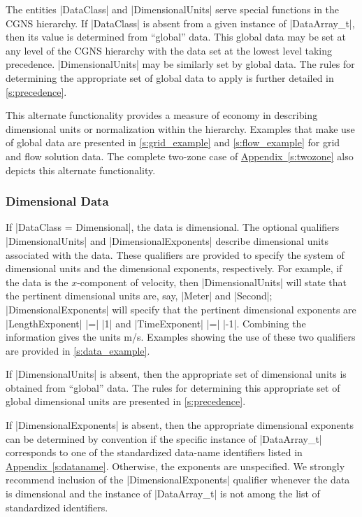 The entities |DataClass| and |DimensionalUnits| serve special functions in
the CGNS hierarchy.  If |DataClass| is absent from a given instance of
|DataArray_t|, then its value is determined from ``global'' data.  This global
data may be set at any level of the CGNS hierarchy with the data set at the
lowest level taking precedence.  |DimensionalUnits| may be similarly set by
global data.  The rules for determining the appropriate set of global data to
apply is further detailed in \autoref{s:precedence}.

This alternate functionality provides a measure of economy in describing
dimensional units or normalization within the hierarchy.  Examples that
make use of global data are presented in \autoref{s:grid_example} and
\autoref{s:flow_example} for grid and flow solution data.  The complete
two-zone case of \hyperref[s:twozone]{Appendix~\ref*{s:twozone}} also
depicts this alternate functionality.

\subsubsection{Dimensional Data}
\label{s:data_dim}

If |DataClass = Dimensional|, the data is dimensional.
The optional qualifiers |DimensionalUnits| and |DimensionalExponents|
describe dimensional units associated with the data.
These qualifiers are provided to specify the system of dimensional units
and the dimensional exponents, respectively.
For example, if the data is the $x$-component of velocity, then
|DimensionalUnits| will state that the pertinent dimensional units are,
say, |Meter| and |Second|; |DimensionalExponents| will specify that the
pertinent dimensional exponents are |LengthExponent| |=| |1| and
|TimeExponent| |=| |-1|.
Combining the information gives the units m/s.
Examples showing the use of these two qualifiers are provided in
\autoref{s:data_example}.

If |DimensionalUnits| is absent, then the appropriate set of dimensional
units is obtained from ``global'' data.  The rules for determining
this appropriate set of global dimensional units are presented in
\autoref{s:precedence}.

If |DimensionalExponents| is absent, then the appropriate dimensional
exponents can be determined by convention if the specific instance of
|DataArray_t| corresponds to one of the standardized data-name identifiers
listed in \hyperref[s:dataname]{Appendix~\ref*{s:dataname}}.
Otherwise, the exponents are unspecified.
We strongly recommend inclusion of the |DimensionalExponents| qualifier
whenever the data is dimensional and the instance of |DataArray_t| is not
among the list of standardized identifiers.


